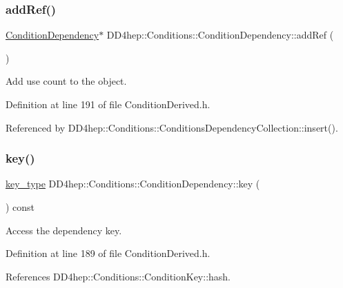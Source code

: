 \subsubsection{\texorpdfstring{add\+Ref()}{addRef()}}
{\footnotesize\ttfamily \hyperlink{class_d_d4hep_1_1_conditions_1_1_condition_dependency}{Condition\+Dependency}$\ast$ D\+D4hep\+::\+Conditions\+::\+Condition\+Dependency\+::add\+Ref (\begin{DoxyParamCaption}{ }\end{DoxyParamCaption})\hspace{0.3cm}{\ttfamily [inline]}}



Add use count to the object. 



Definition at line 191 of file Condition\+Derived.\+h.



Referenced by D\+D4hep\+::\+Conditions\+::\+Conditions\+Dependency\+Collection\+::insert().

\hypertarget{class_d_d4hep_1_1_conditions_1_1_condition_dependency_a7c84c68d86ef440cb5d1735d26a218bb}{}\label{class_d_d4hep_1_1_conditions_1_1_condition_dependency_a7c84c68d86ef440cb5d1735d26a218bb} 
\subsubsection{\texorpdfstring{key()}{key()}}
{\footnotesize\ttfamily \hyperlink{class_d_d4hep_1_1_conditions_1_1_condition_dependency_aeeb9606d1e1aae0a6eb4063ccfd1fca2}{key\+\_\+type} D\+D4hep\+::\+Conditions\+::\+Condition\+Dependency\+::key (\begin{DoxyParamCaption}{ }\end{DoxyParamCaption}) const\hspace{0.3cm}{\ttfamily [inline]}}



Access the dependency key. 



Definition at line 189 of file Condition\+Derived.\+h.



References D\+D4hep\+::\+Conditions\+::\+Condition\+Key\+::hash.



